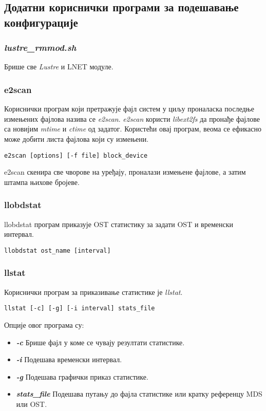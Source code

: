 \subsection{Додатни кориснички програми за подешавање конфигурације}

\subsubsection{\textit{lustre\_rmmod.sh}}
Брише све   \textit{Lustre}  и LNET модуле.

\subsubsection{e2scan}
Кориснички програм који претражује фајл систем у циљу проналаска последње измењених фајлова назива се \textit{e2scan}. \textit{e2scan} користи \textit{libext2fs} да пронађе фајлове са новијим \textit{mtime} и \textit{ctime} од задатог. Користећи овај програм, веома се ефикасно може добити листа фајлова који су измењени.

\begin{verbatim}
e2scan [options] [-f file] block_device
 \end{verbatim}
e2scan скенира све чворове на уређају, проналази измењене фајлове, а затим штампа њихове бројеве.

\subsubsection{llobdstat}
llobdstat програм приказује OST статистику за задати OST и временски интервал.
\begin{verbatim}
llobdstat ost_name [interval]
 \end{verbatim}

\subsubsection{llstat}
Кориснички програм за приказивање статистике је \textit{llstat}.
\begin{verbatim}
llstat [-c] [-g] [-i interval] stats_file
 \end{verbatim}
Опције овог програма су:

\begin{itemize}
\item \textbf{\textit{-c }}
Брише фајл у коме се чувају резултати статистике.
\item \textbf{\textit{-i} }
Подешава временски интервал.
\item \textbf{\textit{-g} }
Подешава графички приказ статистике.
\item \textbf{\textit{stats\_file }}
Подешава путању до фајла статистике или кратку референцу MDS или OST.
\end{itemize}



